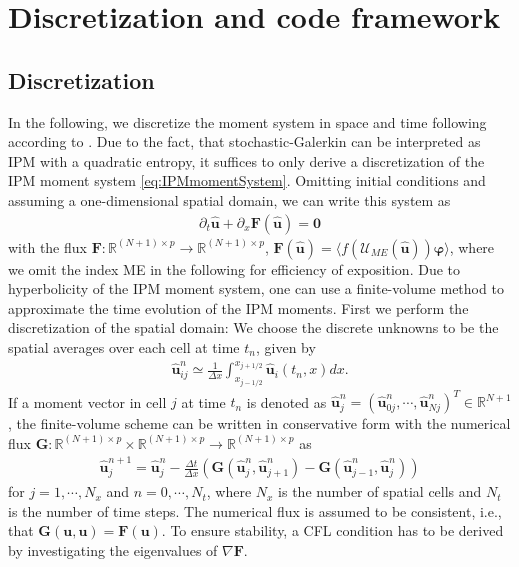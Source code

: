 \section{Discretization and code framework}
\label{sec:framework}
\subsection{Discretization}
In the following, we discretize the moment system in space and time following according to \cite{kusch2017maximum}. Due to the fact, that stochastic-Galerkin can be interpreted as IPM with a quadratic entropy, it suffices to only derive a discretization of the IPM moment system \eqref{eq:IPMmomentSystem}.  
Omitting initial conditions and assuming a one-dimensional spatial domain, we can write this system  as
\begin{align*}
\partial_t \bm{\hat u}+\partial_x \bm{F}(\bm{\hat u}) = \bm{0}
\end{align*}
with the flux $\bm{F}:\mathbb{R}^{(N+1)\times p}\to\mathbb{R}^{(N+1)\times p}$, $\bm{F}(\bm{\hat u})=\langle f(\mathcal{U}_{ME}(\bm{\hat u}))\bm{\varphi} \rangle$, where we omit the index ME in the following for efficiency of exposition. Due to hyperbolicity of the IPM moment system, one can use a finite-volume method to approximate the time evolution of the IPM moments. First we perform the discretization of the spatial domain: We choose the discrete unknowns to be the spatial averages over each cell at time $t_n$, given by
\begin{align*}
\bm{\hat u}_{ij}^n \simeq \frac{1}{\Delta x}\int_{x_{j-1/ 2}}^{x_{j+1/ 2}}\bm{\hat u}_i(t_n,x) dx.
\end{align*}
If a moment vector in cell $j$ at time $t_n$ is denoted as $\bm{\hat u}_j^n = (\bm{\hat u}_{0j}^n,\cdots,\bm{\hat u}_{Nj}^n)^T\in\mathbb{R}^{N+1}$, the finite-volume scheme can be written in conservative form with the numerical flux $\bm{G}:\mathbb{R}^{(N+1)\times p}\times\mathbb{R}^{(N+1)\times p}\to\mathbb{R}^{(N+1)\times p}$ as
\begin{align}\label{eq:IPMDiscretization}
\bm{\hat u}_{j}^{n+1} = \bm{\hat u}_{j}^{n}  - \frac{\Delta t}{\Delta x}\left( \bm{G}(\bm{\hat u}_{j}^{n},\bm{\hat u}_{j+1}^{n})- \bm{G}(\bm{\hat u}_{j-1}^{n},\bm{\hat u}_{j}^{n})\right)
\end{align}
for $j = 1,\cdots,N_x$ and $n = 0,\cdots,N_t$, where $N_x$ is the number of spatial cells and $N_t$ is the number of time steps.
The numerical flux is assumed to be consistent, i.e., that $\bm{G}(\bm{u},\bm{u})=\bm{F}(\bm{u})$.
To ensure stability, a CFL condition has to be derived by investigating the eigenvalues of $\nabla \bm{F}$.

